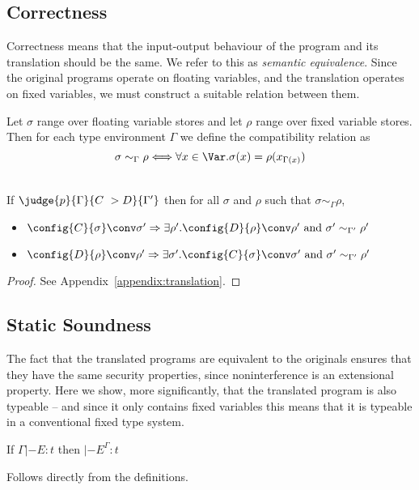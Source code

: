 \documentclass{sigplanconf}
\begin{document}
\subsection{Correctness}

Correctness means that the input-output behaviour of the program and
its translation should be the same. We refer to this as \emph{semantic
  equivalence}.  Since the original programs operate on floating
variables, and the translation operates on fixed variables, we must
construct a suitable relation between them.

\begin{definition}\label{def:store}
Let $\sigma$ range over floating variable stores and
let $\rho$ range over fixed variable stores.
Then for each type environment $\Gamma$
we define the compatibility relation as
\[
\sigma \sim_\Gamma \rho <=> \forall x \in \Var. \sigma(x) = \rho(x_{\Gamma(x)})
\]
\end{definition}

\begin{theorem}\label{theorem:trans-dynamic}
\mbox{} \\ 
If $\judge{p}{\Gamma}{C ~> D}{\Gamma'}$ then for all $\sigma$ and $\rho$ such that 
$\sigma \sim_\Gamma \rho$, 
\begin{itemize}
\item $\config{C}{\sigma} \conv \sigma' => \exists \rho'. \config{D}{\rho} \conv \rho' \text{ and } \sigma' \sim_{\Gamma'} \rho'$
\item $\config{D}{\rho} \conv \rho' => \exists \sigma'. 
  \config{C}{\sigma} \conv \sigma' \text{ and } \sigma' \sim_{\Gamma'} \rho'$
\end{itemize}
\end{theorem}
\begin{proof}
See Appendix~\ref{appendix:translation}.
\end{proof}

\subsection{Static Soundness} 
The fact that the translated programs are equivalent to the originals ensures
that they have the same security properties, since noninterference is an extensional property. 
Here we show, more significantly, 
that the translated program is also typeable -- and since
it only contains fixed variables this means that it is typeable in a
conventional fixed type system.

\begin{lemma}
\label{lemma:expression-soundness}
If $\Gamma |- E : t$ then $|- E^\Gamma : t$
\end{lemma}
Follows directly from the definitions.
\end{document}
